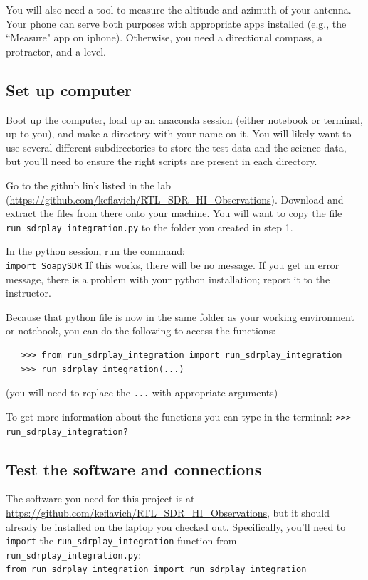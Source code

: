 \documentclass[11pt]{article}
\begin{document}
You will also need a tool to measure the altitude and azimuth of your antenna.
Your phone can serve both purposes with appropriate apps installed (e.g., the ``Measure" app on iphone).
Otherwise, you need a directional compass, a protractor, and a level.



\subsection{Set up computer}
\label{sec:computer}
Boot up the computer, load up an anaconda session (either notebook or terminal,
up to you), and make a directory with your name on it.  You will likely want to
use several different subdirectories to store the test data and the science
data, but you'll need to ensure the right scripts are present in each
directory.

Go to the github link listed in the lab
(\url{https://github.com/keflavich/RTL_SDR_HI_Observations}). Download and
extract the files from there onto your machine. You will want to copy the file
\verb|run_sdrplay_integration.py|  to the
folder you created in step 1.

In the python session, run the command: \\
\verb|import SoapySDR|
If this works, there will be no message.  If you get an error message, there is
a problem with your python installation; report it to the instructor.


Because that python file is now in the same folder as your working
environment or notebook, you can do the following to access the functions:
\begin{verbatim}
   >>> from run_sdrplay_integration import run_sdrplay_integration
   >>> run_sdrplay_integration(...)
\end{verbatim}
(you will need to replace the \verb|...| with appropriate arguments)

To get more information about the functions you can type in the terminal:
   \verb|>>> run_sdrplay_integration?|





\subsection{Test the software and connections}

The software you need for this project is at
\url{https://github.com/keflavich/RTL_SDR_HI_Observations}, but it should
already be installed on the laptop you checked out.  Specifically, you'll need
to \texttt{import} the \texttt{run\_sdrplay\_integration} function from
\texttt{run\_sdrplay\_integration.py}:\\
\verb|from run_sdrplay_integration import run_sdrplay_integration|
\end{document}
